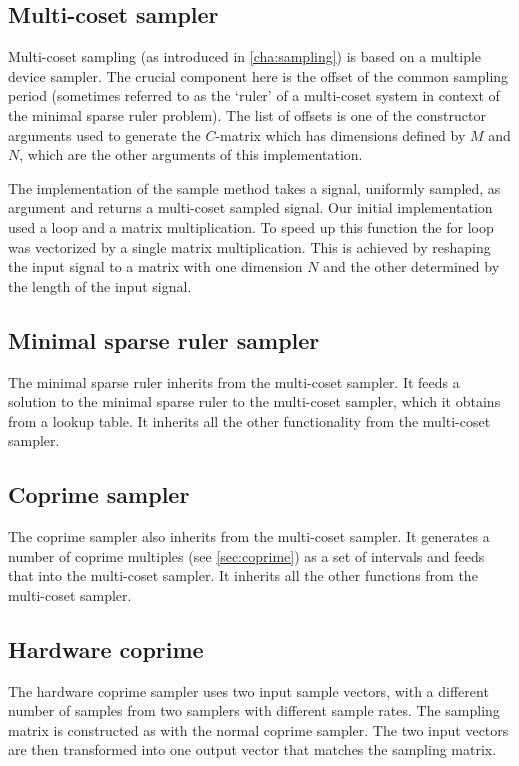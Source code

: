 \documentclass[a4paper, openany, oneside]{memoir}
\begin{document}
\subsection{Multi-coset sampler}
\label{sub:multi_coset_sampler}
Multi-coset sampling (as introduced in \cref{cha:sampling}) is based on a multiple device sampler. The crucial component here is the offset of the common sampling period (sometimes referred to as the `ruler' of a multi-coset system in context of the minimal sparse ruler problem). The list of offsets is one of the constructor arguments used to generate the $C$-matrix which has dimensions defined by $M$ and $N$, which are the other arguments of this implementation.

The implementation of the sample method takes a signal, uniformly sampled, as argument and returns a multi-coset sampled signal. Our initial implementation used a loop and a matrix multiplication. To speed up this function the for loop was vectorized by a single matrix multiplication. This is achieved by reshaping the input signal to a matrix with one dimension $N$ and the other determined by the length of the input signal.

\subsection{Minimal sparse ruler sampler}
\label{sec:multi-coset-sampler}
The minimal sparse ruler inherits from the multi-coset sampler. It feeds a solution to the minimal sparse ruler to the multi-coset sampler, which it obtains from a lookup table. It inherits all the other functionality from the multi-coset sampler.

\subsection{Coprime sampler}
\label{sec:coprime-sampler}
The coprime sampler also inherits from the multi-coset sampler. It generates a number of coprime multiples (see \cref{sec:coprime}) as a set of intervals and feeds that into the multi-coset sampler. It inherits all the other functions from the multi-coset sampler.

\subsection{Hardware coprime}
\label{sec:hardware-coprime}
The hardware coprime sampler uses two input sample vectors, with a different number of samples from two samplers with different sample rates. The sampling matrix is constructed as with the normal coprime sampler. The two input vectors are then transformed into one output vector that matches the sampling matrix.
\end{document}
